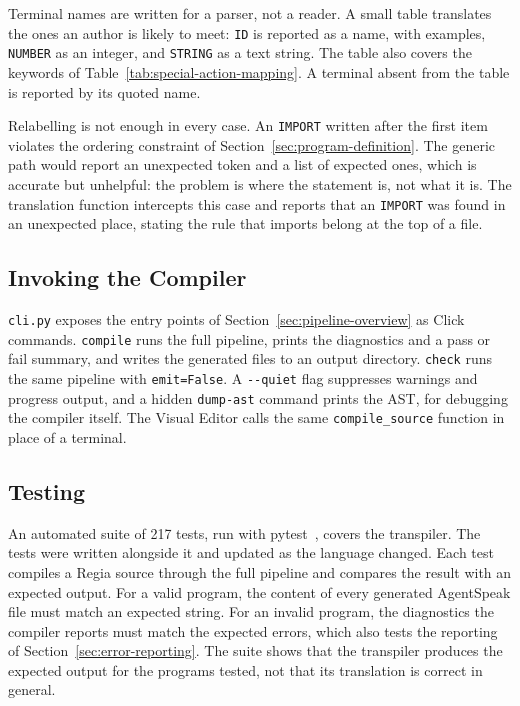 Terminal names are written for a parser, not a reader. A small table translates the ones an author is likely to meet: \lstinline|ID| is reported as a name, with examples, \lstinline|NUMBER| as an integer, and \lstinline|STRING| as a text string. The table also covers the keywords of Table~\ref{tab:special-action-mapping}. A terminal absent from the table is reported by its quoted name.
 
Relabelling is not enough in every case. An \lstinline|IMPORT| written after the first item violates the ordering constraint of Section~\ref{sec:program-definition}. The generic path would report an unexpected token and a list of expected ones, which is accurate but unhelpful: the problem is where the statement is, not what it is. The translation function intercepts this case and reports that an \lstinline|IMPORT| was found in an unexpected place, stating the rule that imports belong at the top of a file.
 
 
\subsection{Invoking the Compiler}
\label{sec:orchestration}
 
\lstinline|cli.py| exposes the entry points of Section~\ref{sec:pipeline-overview} as Click commands. \lstinline|compile| runs the full pipeline, prints the diagnostics and a pass or fail summary, and writes the generated files to an output directory. \lstinline|check| runs the same pipeline with \lstinline|emit=False|. A \lstinline|--quiet| flag suppresses warnings and progress output, and a hidden \lstinline|dump-ast| command prints the AST, for debugging the compiler itself. The Visual Editor calls the same \lstinline|compile_source| function in place of a terminal.

\subsection{Testing}
\label{sec:testing}
 
An automated suite of 217 tests, run with pytest~\cite{pytest}, covers the transpiler. The tests were written alongside it and updated as the language changed. Each test compiles a Regia source through the full pipeline and compares the result with an expected output. For a valid program, the content of every generated AgentSpeak file must match an expected string. For an invalid program, the diagnostics the compiler reports must match the expected errors, which also tests the reporting of Section~\ref{sec:error-reporting}. The suite shows that the transpiler produces the expected output for the programs tested, not that its translation is correct in general.


